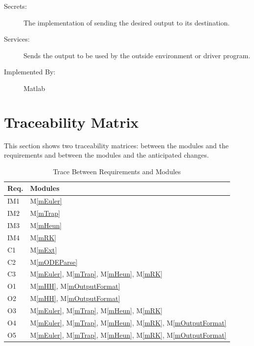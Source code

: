 \documentclass[12pt, titlepage]{article}
\newcommand{\mref}[1]{M\ref{#1}}
\begin{document}
\begin{description}
\item[Secrets:]The implementation of sending the desired output to its destination.
\item[Services:]Sends the output to be used by the outside environment or driver program.
\item[Implemented By:] Matlab
\end{description}

\section{Traceability Matrix} \label{SecTM}

This section shows two traceability matrices: between the modules and the
requirements and between the modules and the anticipated changes.

\begin{table}[H]
\centering
\begin{tabular}{p{} p{}}
\toprule
\textbf{Req.} & \textbf{Modules}\\
\midrule
IM1 & \mref{mEuler}\\
IM2 & \mref{mTrap}\\
IM3 & \mref{mHeun}\\
IM4 & \mref{mRK}\\
C1 & \mref{mExt}\\
C2 & \mref{mODEParse}\\
C3 & \mref{mEuler}, \mref{mTrap}, \mref{mHeun}, \mref{mRK}\\
O1 & \mref{mHH}, \mref{mOutputFormat}\\
O2 & \mref{mHH}, \mref{mOutputFormat}\\
O3 & \mref{mEuler}, \mref{mTrap}, \mref{mHeun}, \mref{mRK}\\
O4 & \mref{mEuler}, \mref{mTrap}, \mref{mHeun}, \mref{mRK}, \mref{mOutputFormat}\\
O5 & \mref{mEuler}, \mref{mTrap}, \mref{mHeun}, \mref{mRK}, \mref{mOutputFormat}\\
\bottomrule
\end{tabular}
\caption{Trace Between Requirements and Modules}
\label{TblRT}
\end{table}
\end{document}
